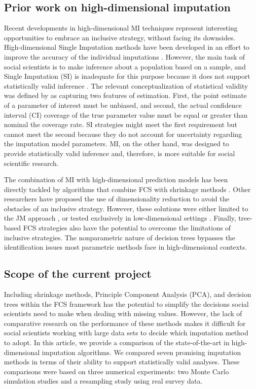 \subsection{Prior work on high-dimensional imputation}
Recent developments in high-dimensional MI techniques represent interesting opportunities to embrace an
inclusive strategy, without facing its downsides.
High-dimensional Single Imputation methods have been developed in 
an effort to improve the accuracy of the individual imputations \citep[e.g.,][]{kimEtAl:2005, stekhovenBuhlmann:2011, 
d'ambrosioEtAl:2012}. 
However, the main task of social scientists is to make inference about a population based on a sample, and Single Imputation (SI) is inadequate for this purpose because it does not support statistically valid 
inference \citep{rubin:1996}.
The relevant conceptualization of statistical validity was defined by \citet{rubin:1996} as capturing two features of 
estimation.
First, the point estimate of a parameter of interest must be unbiased, and second, the actual 
confidence interval (CI) coverage of the true parameter value must be equal or greater than nominal the
coverage rate.
SI strategies might meet the first requirement but cannot meet the second because they 
do not account for uncertainty regarding the imputation model parameters.
MI, on the other hand, was designed to provide statistically valid inference and, therefore, is 
more suitable for social scientific research.

The combination of MI with high-dimensional prediction models has been directly tackled by algorithms that combine 
FCS with shrinkage methods \citep{zhaoLong:2016, dengEtAl:2016}.
Other researchers have proposed the use of dimensionality reduction to avoid the obstacles of an inclusive strategy.
However, these solutions were either limited to the JM approach \citep{songBelin:2004}, 
or tested exclusively in low-dimensional settings \citep{howardEtAl:2015}.
Finally, tree-based FCS strategies also have the potential to overcome the limitations of inclusive strategies.
The nonparametric nature of decision trees bypasses the identification issues most parametric methods face
in high-dimensional contexts.

\subsection{Scope of the current project}
Including shrinkage methods, Principle Component Analysis (PCA), and decision trees within the FCS framework 
has the potential to simplify the decisions social scientists need to make when dealing with missing values.
However, the lack of comparative research on the performance of these methods makes it difficult for social scientists working with 
large data sets to decide which imputation method to adopt.
In this article, we provide a comparison of the state-of-the-art in high-dimensional imputation algorithms.
We compared seven promising imputation methods in terms of their ability to support statistically valid analyses.
These comparisons were based on three numerical experiments: two Monte Carlo simulation studies and a resampling study using real survey data.

